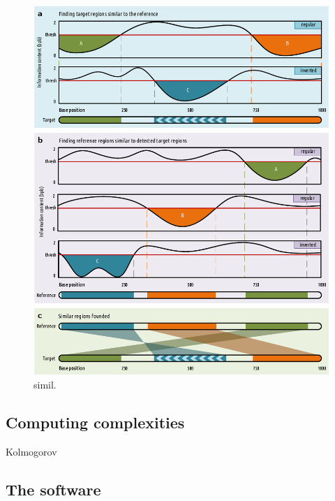 \begin{figure}[!h]
  \centering
\includegraphics[width=.95\linewidth]{simil.pdf}
\caption{simil.}
\label{fig.simil}
\end{figure}

\subsection{Computing complexities}
Kolmogorov

\subsection{The software}
\label{subsec.software}

